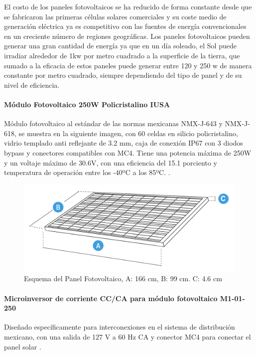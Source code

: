 El costo de los paneles fotovoltaicos se ha reducido de forma constante desde que se fabricaron las primeras células solares comerciales y su coste medio de generación eléctrica ya es competitivo con las fuentes de energía convencionales en un creciente número de regiones geográficas.
Los paneles fotovoltaicos pueden generar una gran cantidad de energía ya que en un día soleado, el Sol puede irradiar alrededor de 1kw por metro cuadrado a la superficie de la tierra, que sumado a la eficacia de estos paneles puede generar entre 120 y 250 w de manera constante por metro cuadrado, siempre dependiendo del tipo de panel y de su nivel de eficiencia.

\paragraph{Módulo Fotovoltaico 250W Policristalino IUSA}
Módulo fotovoltaico al estándar de las normas mexicanas NMX-J-643 y NMX-J-618, se muestra en la siguiente imagen, con 60 celdas en silicio policristalino, vidrio templado anti reflejante de 3.2 mm, caja de conexión IP67 con 3 diodos bypass y conectores compatibles con MC4.
Tiene una potencia máxima de 250W y un voltaje máximo de 30.6V, con una eficiencia del 15.1 porciento y temperatura de operación entre los -40ºC a los 85ºC. \citep{MarcoTeorico3}.

\begin{figure}[H]
	\centering
	\includegraphics[scale=.25]{Capitulo2/images/panel.png}
	\caption{Esquema del Panel Fotovoltaico, A: 166 cm, B: 99 cm. C: 4.6 cm}
	\label{fig:diagrama_dispensador}
\end{figure}

\paragraph{Microinversor de corriente CC/CA para módulo fotovoltaico M1-01-250}
Diseñado específicamente para interconexiones en el sistema de distribución mexicano, con una salida de 127 V a 60 Hz CA y conector MC4 para conectar el panel solar \citep{MarcoTeorico3}.

